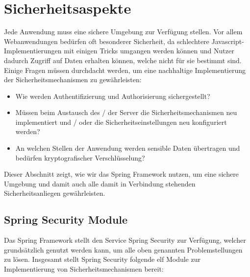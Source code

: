\section{Sicherheitsaspekte}

Jede Anwendung muss eine sichere Umgebung zur Verfügung stellen. Vor allem 
Webanwendungen bedürfen oft besonderer Sicherheit, da schlechtere Javascript-
Implementierungen mit einigen Tricks umgangen werden können und Nutzer dadurch 
Zugriff auf Daten erhalten können, welche nicht für sie bestimmt sind. Einige 
Fragen müssen durchdacht werden, um eine nachhaltige Implementierung der 
Sicherheitsmechanismen zu gewährleisten:

\begin{itemize}
\item Wie werden Authentifizierung und Authorisierung sichergestellt?
\item Müssen beim Austausch des / der Server die Sicherheitsmechanismen neu implementiert und / oder die
	  Sicherheitseinstellungen neu konfiguriert werden?
\item An welchen Stellen der Anwendung werden sensible Daten übertragen und bedürfen kryptografischer 	      
      Verschlüsselung?
\end{itemize} 

Dieser Abschnitt zeigt, wie wir das Spring Framework nutzen, um eine sichere 
Umgebung und damit auch alle damit in Verbindung stehenden Sicherheitsanliegen 
gewährleisten.

\subsection{Spring Security Module}
\label{subsec:spring_security}

Das Spring Framework stellt den Service Spring Security zur Verfügung, welcher grundsätzlich genutzt 
werden kann, um alle oben genannten Problemstellungen zu lösen. Insgesamt stellt Spring Security folgende 
elf Module zur Implementierung von Sicherheitsmechanismen bereit:

